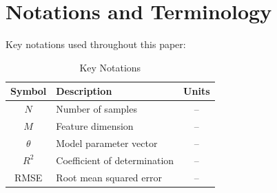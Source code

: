 \section{Notations and Terminology}

Key notations used throughout this paper:

\begin{table}[htbp]
  \centering
  \caption{Key Notations}
  \begin{tabular}{clc}
    \toprule
    \textbf{Symbol} & \textbf{Description} & \textbf{Units} \\
    \midrule
    $N$    & Number of samples               & -- \\
    $M$    & Feature dimension               & -- \\
    $\theta$ & Model parameter vector        & -- \\
    $R^2$  & Coefficient of determination    & -- \\
    RMSE   & Root mean squared error         & -- \\
    \bottomrule
  \end{tabular}
\end{table}

